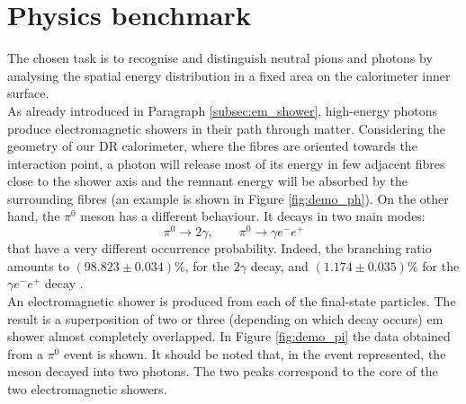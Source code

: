 \section{Physics benchmark}
The chosen task is to recognise and distinguish neutral pions and photons by analysing the spatial energy distribution in a fixed area on the calorimeter inner surface.\\
As already introduced in Paragraph \ref{subsec:em_shower}, high-energy photons produce electromagnetic showers in their path through matter. Considering the geometry of our DR calorimeter, where the fibres are oriented towards the interaction point, a photon will release most of its energy in few adjacent fibres close to the shower axis and the remnant energy will be absorbed by the surrounding fibres (an example is shown in Figure \ref{fig:demo_ph}).
On the other hand, the $\pi^0$ meson has a different behaviour. It decays in two main modes:
\begin{equation}
    \pi^0\xrightarrow{} 2\gamma, \qquad \pi^0\xrightarrow{} \gamma e^- e^+
\end{equation}
that have a very different occurrence probability. Indeed, the branching ratio amounts to $(98.823\pm0.034)\%$, for the $2\gamma$ decay, and $(1.174\pm0.035)\%$ for the $\gamma e^- e^+$ decay \cite{pi_decay}.\\
An electromagnetic shower is produced from each of the final-state particles. The result is a superposition of two or three (depending on which decay occurs) em shower almost completely overlapped. In Figure \ref{fig:demo_pi} the data obtained from a $\pi^0$ event is shown. It should be noted that, in the event represented, the meson decayed into two photons. The two peaks correspond to the core of the two electromagnetic showers.\\

